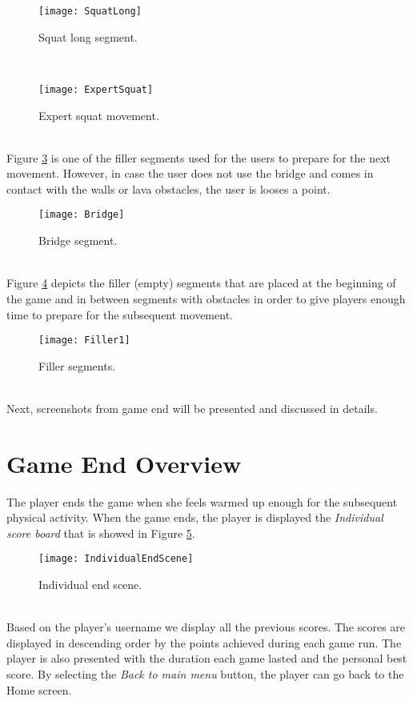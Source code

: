 \begin{figure}[h]
    \centering
    \texttt{[image: SquatLong]}
    \caption{Squat long segment.}
    \label{fig:squatlong}
\end{figure}\\
\begin{figure}[h]
    \centering
    \texttt{[image: ExpertSquat]}
    \caption{Expert squat movement.}
    \label{fig:squatlong}
\end{figure}\\
Figure \ref{fig:bridge} is one of the filler segments used for the users to prepare for the next movement. However, in case the user does not use the bridge and comes in contact with the walls or lava obstacles, the user is looses a point.
\begin{figure}[h]
    \centering
    \texttt{[image: Bridge]}
    \caption{Bridge segment.}
    \label{fig:bridge}
\end{figure}\\
Figure \ref{fig:filler} depicts the filler (empty) segments that are placed at the beginning of the game and in between segments with obstacles in order to give players enough time to prepare for the subsequent movement.
\begin{figure}[h]
    \centering
    \texttt{[image: Filler1]}
    \caption{Filler segments.}
    \label{fig:filler}
\end{figure}\\
Next, screenshots from game end will be presented and discussed in details.\pagebreak
\section{Game End Overview}
The player ends the game when she feels warmed up enough for the subsequent physical activity. When the game ends, the player is displayed the \textit{Individual score board} that is showed in Figure \ref{fig:individualend}.\\
\begin{figure}[h]
    \centering
    \texttt{[image: IndividualEndScene]}
    \caption{Individual end scene.}
    \label{fig:individualend}
\end{figure}\\
Based on the player's username we display all the previous scores. The scores are displayed in descending order by the points achieved during each game run. The player is also presented with the duration each game lasted and the personal best score. By selecting the \textit{Back to main menu} button, the player can go back to the Home screen. 

\label{endgamelabel}
